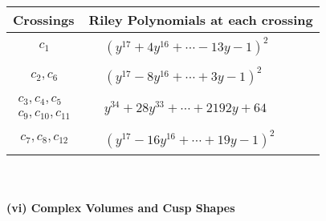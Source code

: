 \documentclass[1p]{elsarticle_modified}
\theoremstyle{definition}
\begin{document}
\begin{tabular}{m{50pt}|m{274pt}}
Crossings & \hspace{64pt}Riley Polynomials at each crossing \\
\hline $$\begin{aligned}c_{1}\end{aligned}$$&$\begin{aligned}
&(y^{17}+4 y^{16}+\cdots-13 y-1)^{2}
\end{aligned}$\\
\hline $$\begin{aligned}c_{2},c_{6}\end{aligned}$$&$\begin{aligned}
&(y^{17}-8 y^{16}+\cdots+3 y-1)^{2}
\end{aligned}$\\
\hline $$\begin{aligned}c_{3},c_{4},c_{5}\\c_{9},c_{10},c_{11}\end{aligned}$$&$\begin{aligned}
&y^{34}+28 y^{33}+\cdots+2192 y+64
\end{aligned}$\\
\hline $$\begin{aligned}c_{7},c_{8},c_{12}\end{aligned}$$&$\begin{aligned}
&(y^{17}-16 y^{16}+\cdots+19 y-1)^{2}
\end{aligned}$\\
\hline
\end{tabular}\\~\\
\newpage\flushleft \textbf{(vi) Complex Volumes and Cusp Shapes}
\end{document}
